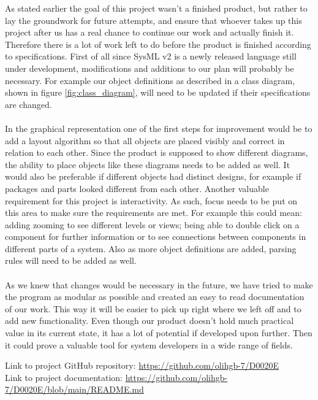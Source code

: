\documentclass{article}
\begin{document}
As stated earlier the goal of this project wasn't a finished product, but rather to lay the groundwork for future attempts, and ensure that whoever takes up this project after us has a real chance to continue our work and actually finish it. Therefore there is a lot of work left to do before the product is finished according to specifications. First of all since SysML v2 is a newly released language still under development, modifications and additions to our plan will probably be necessary. For example our object definitions as described in a class diagram, shown in figure \ref{fig:class_diagram}, will need to be updated if their specifications are changed. 
\\\\
In the graphical representation one of the first steps for improvement would be to add a layout algorithm so that all objects are placed visibly and correct in relation to each other. Since the product is supposed to show different diagrams, the ability to place objects like these diagrams needs to be added as well. It would also be preferable if different objects had distinct designs, for example if packages and parts looked different from each other. Another valuable requirement for this project is interactivity. As such, focus needs to be put on this area to make sure the requirements are met. For example this could mean: adding zooming to see different levels or views; being able to double click on a component for further information or to see connections between components in different parts of a system. Also as more object definitions are added, parsing rules will need to be added as well. 
\\\\
As we knew that changes would be necessary in the future, we have tried to make the program as modular as possible and created an easy to read documentation of our work. This way it will be easier to pick up right where we left off and to add new functionality. Even though our product doesn't hold much practical value in its current state, it has a lot of potential if developed upon further. Then it could prove a valuable tool for system developers in a wide range of fields. 


\newpage
\printbibliography


\appendix
\appendixpage
\addappheadtotoc

Link to project GitHub repository: \url{https://github.com/olihgb-7/D0020E}                \\
Link to project documentation: \url{https://github.com/olihgb-7/D0020E/blob/main/README.md}
\end{document}
